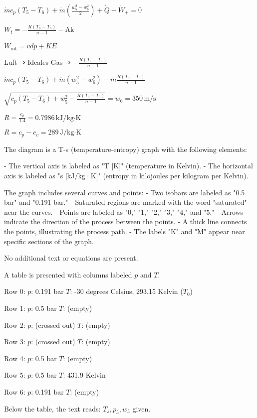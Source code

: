 \( \dot{m} c_p (T_5 - T_6) + \dot{m} \left( \frac{w_5^2 - w_6^2}{2} \right) + \dot{Q} - \dot{W}_+ = 0 \)  

\( W_t = -\frac{R (T_6 - T_5)}{n - 1} - \text{Ak} \)  

\( \dot{W}_{\text{rot}} = vdp + KE \)  

Luft ⇒ Ideales Gas ⇒ \( -\frac{R (T_6 - T_5)}{n - 1} \)  

\( \dot{m} c_p (T_5 - T_6) + \dot{m} (w_5^2 - w_6^2) - \dot{m} \frac{R (T_6 - T_5)}{n - 1} \)  

\( \sqrt{c_p (T_5 - T_6) + w_5^2 - \frac{R (T_6 - T_5)}{n - 1}} = w_6 = 350 \, \text{m/s} \)  

\( R = \frac{c_p}{1.4} = 0.7986 \, \text{kJ/kg·K} \)  

\( R = c_p - c_v = 289 \, \text{J/kg·K} \)

The diagram is a T-s (temperature-entropy) graph with the following elements:  

- The vertical axis is labeled as "T [K]" (temperature in Kelvin).  
- The horizontal axis is labeled as "s [kJ/kg·K]" (entropy in kilojoules per kilogram per Kelvin).  

The graph includes several curves and points:  
- Two isobars are labeled as "0.5 bar" and "0.191 bar."  
- Saturated regions are marked with the word "saturated" near the curves.  
- Points are labeled as "0," "1," "2," "3," "4," and "5."  
- Arrows indicate the direction of the process between the points.  
- A thick line connects the points, illustrating the process path.  
- The labels "K" and "M" appear near specific sections of the graph.  

No additional text or equations are present.

A table is presented with columns labeled \( p \) and \( T \).  

Row 0:  
\( p \): 0.191 bar  
\( T \): -30 degrees Celsius, 293.15 Kelvin (\( T_0 \))  

Row 1:  
\( p \): 0.5 bar  
\( T \): (empty)  

Row 2:  
\( p \): (crossed out)  
\( T \): (empty)  

Row 3:  
\( p \): (crossed out)  
\( T \): (empty)  

Row 4:  
\( p \): 0.5 bar  
\( T \): (empty)  

Row 5:  
\( p \): 0.5 bar  
\( T \): 431.9 Kelvin  

Row 6:  
\( p \): 0.191 bar  
\( T \): (empty)  

Below the table, the text reads:  
\( T_s, p_5, w_5 \) given.